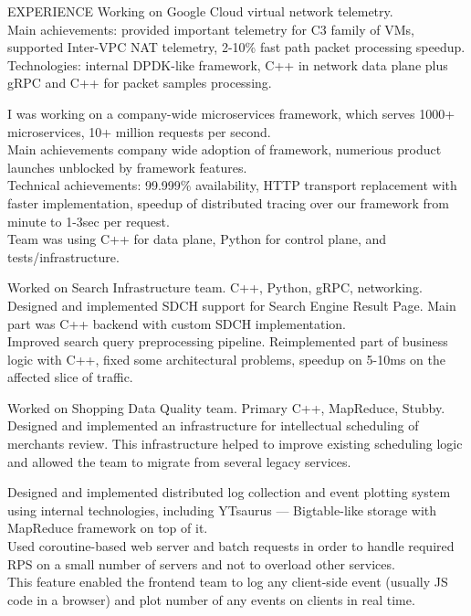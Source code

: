 \documentclass[12pt]{cutecv}
\begin{document}
\begin{paracol}{2}
\begin{leftcolumn}
\end{leftcolumn}

\begin{rightcolumn}
\begin{cvsection}{EXPERIENCE}
  {Working on Google Cloud virtual network telemetry. \\
  Main achievements: provided important telemetry for C3 family of VMs, supported Inter-VPC NAT telemetry, 2-10\% fast path packet processing speedup. \\
  Technologies: internal DPDK-like framework, C++ in network data plane plus gRPC and C++ for packet samples processing.}
  
  {I was working on a company-wide microservices framework, which serves
  1000+ microservices, 10+ million requests per second.\\
  Main achievements company wide adoption of framework, 
  numerious product launches unblocked by framework features. \\
  Technical achievements: 99.999\% availability, HTTP transport replacement
  with faster implementation, speedup of distributed tracing over our
  framework from minute to 1-3sec per request. \\
  Team was using C++ for data plane, Python for control plane, and tests/infrastructure.}

  {Worked on Search Infrastructure team. C++, Python, gRPC, networking.
  Designed and implemented SDCH support for Search Engine Result Page.
  Main part was C++ backend with custom SDCH implementation.\\
  Improved search query preprocessing pipeline. Reimplemented part of business logic with C++, 
  fixed some architectural problems, speedup on 5-10ms on the affected slice of traffic.}
  
  {Worked on Shopping Data Quality team. Primary C++, MapReduce, Stubby.
   Designed and implemented an infrastructure for intellectual scheduling of merchants review. This infrastructure helped to improve existing scheduling logic
   and allowed the team to migrate from several legacy services.}
  
  {Designed and implemented distributed log collection and event
   plotting system using internal technologies, including YTsaurus — Bigtable-like
   storage with MapReduce framework on top of it. \\
   Used coroutine-based web server and batch requests in order
   to handle required RPS on a small number of servers and not to overload
   other services. \\
   This feature enabled the frontend team to log any client-side
   event (usually JS code in a browser) and plot number of any events on
   clients in real time.}


\end{cvsection}
\end{rightcolumn}
\end{paracol}
\end{document}
